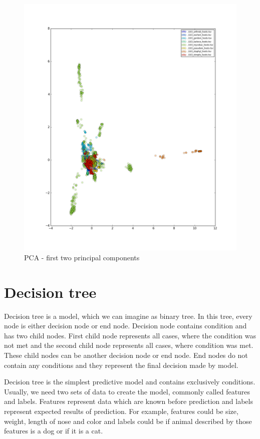 \begin{figure}[htp]
\includegraphics[width=\linewidth]{./images/pca.png}
\centering
\caption{PCA - first two principal components}
\end{figure}

\section{Decision tree}
Decision tree is a model, which we can imagine as binary tree.
In this tree, every node is either decision node or end node.
Decision node contains condition and has two child nodes.
First child node represents all cases, where the condition was not met and the second child node represents all cases, where condition was met.
These child nodes can be another decision node or end node.
End nodes do not contain any conditions and they represent the final decision made by model.

Decision tree is the simplest predictive model and contains exclusively conditions.
Usually, we need two sets of data to create the model, commonly called features and labels.
Features represent data which are known before prediction and labels represent expected results of prediction.
For example, features could be size, weight, length of nose and color and labels could be if animal described by those features is a dog or if it is a cat.

